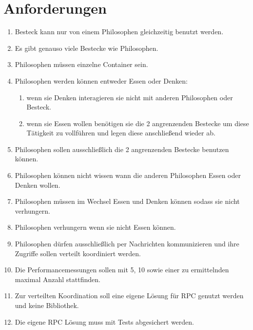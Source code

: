 \section{Anforderungen}
\begin{enumerate}
    \item Besteck kann nur von einem Philosophen gleichzeitig benutzt werden.
    \item Es gibt genauso viele Bestecke wie Philosophen.
    \item Philosophen müssen einzelne Container sein.
    \item Philosophen werden können entweder Essen oder Denken:
          \begin{enumerate}
              \item wenn sie Denken interagieren sie nicht mit anderen Philosophen oder Besteck.
              \item wenn sie Essen wollen benötigen sie die 2 angrenzenden Bestecke um diese Tätigkeit zu vollführen und legen diese anschließend wieder ab.
          \end{enumerate}
    \item Philosophen sollen ausschließlich die 2 angrenzenden Bestecke benutzen können.
    \item Philosophen können nicht wissen wann die anderen Philosophen Essen oder Denken wollen.
    \item Philosophen müssen im Wechsel Essen und Denken können sodass sie nicht verhungern.
    \item Philosophen verhungern wenn sie nicht Essen können.
    \item Philosophen dürfen ausschließlich per Nachrichten kommunizieren und ihre Zugriffe sollen verteilt koordiniert werden.
    \item Die Performancemessungen sollen mit 5, 10 sowie einer zu ermittelnden maximal Anzahl stattfinden.
    \item Zur verteilten Koordination soll eine eigene Lösung für RPC genutzt werden und keine Bibliothek.
    \item Die eigene RPC Lösung muss mit Tests abgesichert werden.
\end{enumerate}